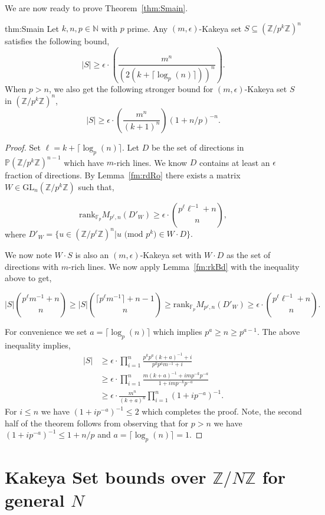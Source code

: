 \documentclass[11pt]{article}
\numberwithin{equation}{section}
\def\GL{\text{GL}}
\def\F{{\mathbb{F}}}
\def\Z{{\mathbb{Z}}}
\def\N{{\mathbb{N}}}
\def\P{{\mathbb{P}}}
\begin{document}
We are now ready to prove Theorem~\ref{thm:Smain}.

\begin{repthm}{thm:Smain}
Let $k,n,p\in \N$ with $p$ prime. Any $(m,\epsilon)$-Kakeya set $S\subseteq (\Z/p^k\Z)^n$ satisfies the following bound,
$$|S| \ge \epsilon\cdot\left(\frac{m^n}{(2(k+\lceil\log_p(n)\rceil))^n}\right).$$
When $p>n$, we also get the following stronger bound for $(m,\epsilon)$-Kakeya set $S$ in $(\Z/p^k\Z)^n$,
$$|S|\ge \epsilon\cdot\left(\frac{m^n}{(k+1)^n}\right) (1+n/p)^{-n}.$$
\end{repthm}
\begin{proof}
Set $\ell = k+\lceil \log_p(n)\rceil$. Let $D$ be the set of directions in $\P (\Z/p^k\Z)^{n-1}$ which have $m$-rich lines. We know $D$ contains at least an $\epsilon$ fraction of directions. By Lemma~\ref{fm:rdRo} there exists a matrix $W\in \GL_n(\Z/p^k\Z)$ such that,

$$\text{rank}_{\F_p} M_{p^\ell,n}(D'_W)\ge \epsilon \cdot \binom{p^\ell \ell^{-1}+n}{n},$$
where $D'_W=\{u\in (\Z/p^\ell\Z)^{n}| u\text{ (mod }p^k\text{)}\in W \cdot D\}.$

We now note $W\cdot S$ is also an $(m,\epsilon)$-Kakeya set with $W\cdot D$ as the set of directions with $m$-rich lines. We now apply Lemma~\ref{fm:rkBd} with the inequality above to get,

$$|S|\binom{p^\ell m^{-1}+n}{n}\ge |S|\binom{\lceil p^\ell m^{-1}\rceil+n-1}{n}\ge \text{rank}_{\F_p} M_{p^\ell,n}(D'_W) \ge \epsilon \cdot \binom{p^\ell \ell^{-1} +n}{n}.$$

For convenience we set $a=\lceil \log_p(n)\rceil$ which implies $p^{a}\ge n\ge p^{a-1}$. The above inequality implies,
\begin{align*}
    |S| &\ge \epsilon \cdot \prod\limits_{i=1}^n \frac{p^k p^{a} (k+a)^{-1} +i}{p^k p^{a} m^{-1}+i}\\
    &\ge \epsilon \cdot \prod\limits_{i=1}^n \frac{ m(k+a)^{-1} +i m p^{-k} p^{-a}}{1+i m p^{-k} p^{-a}}\\
    &\ge \epsilon \cdot \frac{m^n}{(k+a)^{n}} \prod\limits_{i=1}^n\left(1+i p^{-a} \right)^{-1}.
\end{align*}
For $i\le n$ we have $\left(1+i p^{-a} \right)^{-1}\le 2$ which completes the proof. Note, the second half of the theorem follows from observing that for $p>n$ we have $\left(1+i p^{-a} \right)^{-1}\le 1+n/p$ and $a=\lceil\log_p(n)\rceil=1$.
\end{proof}

\section{Kakeya Set bounds over $\Z/N\Z$ for general $N$}\label{sec:Nbd}
\end{document}
